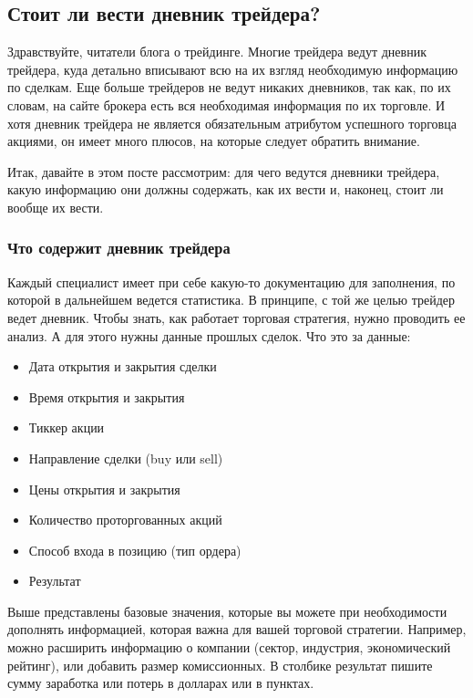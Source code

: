 \documentclass[a5paper]{article}
\begin{document}
\subsection{Стоит ли вести дневник трейдера?}

Здравствуйте, читатели блога о трейдинге. Многие трейдера ведут дневник трейдера, куда детально вписывают всю на их взгляд необходимую информацию по сделкам. Еще больше трейдеров не ведут никаких дневников, так как, по их словам, на сайте брокера есть вся необходимая информация по их торговле. И хотя дневник трейдера не является обязательным атрибутом успешного торговца акциями, он имеет много плюсов, на которые следует обратить внимание.

Итак, давайте в этом посте рассмотрим: для чего ведутся дневники
трейдера, какую информацию они должны содержать, как их вести и,
наконец, стоит ли вообще их вести.

\subsubsection{Что содержит дневник трейдера}

Каждый специалист имеет при себе какую-то документацию для заполнения, по которой в дальнейшем ведется статистика. В принципе, с той же целью трейдер ведет дневник. Чтобы знать, как работает торговая стратегия, нужно проводить ее анализ. А для этого нужны данные прошлых сделок. Что это за данные:
\begin{itemize}
\item     Дата открытия и закрытия сделки
\item     Время открытия и закрытия
\item     Тиккер акции
\item     Направление сделки (buy или sell)
\item     Цены открытия и закрытия
\item     Количество проторгованных акций
\item     Способ входа в позицию (тип ордера)
\item     Результат
\end{itemize}

Выше представлены базовые значения, которые вы можете при
необходимости дополнять информацией, которая важна для вашей торговой
стратегии. Например, можно расширить информацию о компании (сектор,
индустрия, экономический рейтинг), или добавить размер комиссионных. В
столбике результат пишите сумму заработка или потерь в долларах или в
пунктах.
\end{document}
